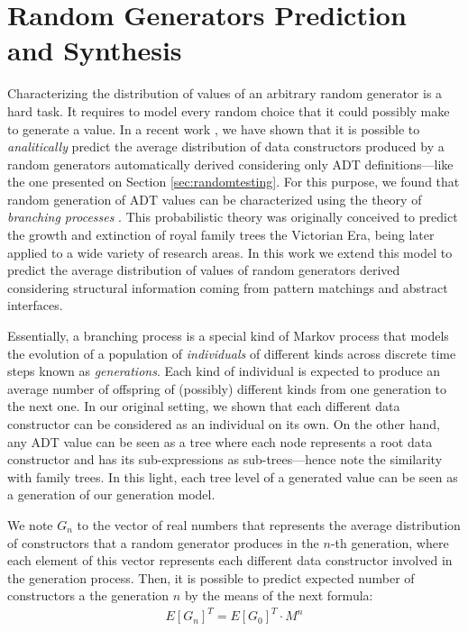 \section{Random Generators Prediction and Synthesis} \label{sec:synthesis}

Characterizing the distribution of values of an arbitrary random generator is a
hard task.
%
It requires to model every random choice that it could possibly make to generate
a value.
%
In a recent work \tocite, we have shown that it is possible to
\emph{analitically} predict the average distribution of data constructors
produced by a random generators automatically derived considering only ADT
definitions---like the one presented on Section \ref{sec:randomtesting}.
%
For this purpose, we found that random generation of ADT values can be
characterized using the theory of \emph{branching processes} \tocite.
%
This probabilistic theory was originally conceived to predict the growth and
extinction of royal family trees the Victorian Era, being later applied to a
wide variety of research areas.
%
In this work we extend this model to predict the average distribution of values
of random generators derived considering structural information coming from
pattern matchings and abstract interfaces.


Essentially, a branching process is a special kind of Markov process that models
the evolution of a population of \emph{individuals} of different kinds across
discrete time steps known as \emph{generations}.
%
Each kind of individual is expected to produce an average number of offspring of
(possibly) different kinds from one generation to the next one.
%
In our original setting, we shown that each different data constructor can be
considered as an individual on its own.
%
On the other hand, any ADT value can be seen as a tree where each node
represents a root data constructor and has its sub-expressions as
sub-trees---hence note the similarity with family trees.
%
In this light, each tree level of a generated value can be seen as a generation
of our generation model.


We note $G_n$ to the vector of real numbers that represents the average
distribution of constructors that a random generator produces in the $n$-th
generation, where each element of this vector represents each different data
constructor involved in the generation process.
%
Then, it is possible to predict expected number of constructors a the generation
$n$ by the means of the next formula:
%
\begin{align*}
  E[G_n]^T = E[G_0]^T \cdot M^n
\end{align*}


